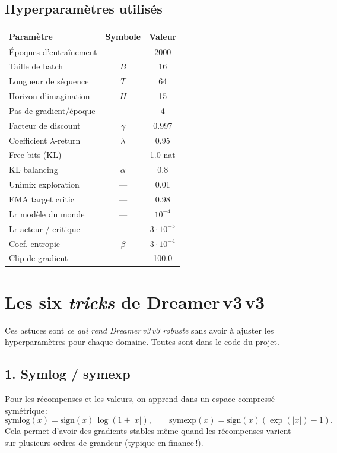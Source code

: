 \documentclass[11pt,a4paper]{article}
\newcommand{\dreamer}{Dreamer\,v3}
\begin{document}
\subsection{Hyperparamètres utilisés}
\begin{center}
\begin{tabular}{lcc}
\toprule
\textbf{Paramètre} & \textbf{Symbole} & \textbf{Valeur} \\
\midrule
Époques d'entraînement & --- & 2000 \\
Taille de batch & \(B\) & 16 \\
Longueur de séquence & \(T\) & 64 \\
Horizon d'imagination & \(H\) & 15 \\
Pas de gradient/époque & --- & 4 \\
Facteur de discount & \(\gamma\) & 0.997 \\
Coefficient \(\lambda\)-return & \(\lambda\) & 0.95 \\
Free bits (KL) & --- & 1.0 nat \\
KL balancing & \(\alpha\) & 0.8 \\
Unimix exploration & --- & 0.01 \\
EMA target critic & --- & 0.98 \\
Lr modèle du monde & --- & \(10^{-4}\) \\
Lr acteur / critique & --- & \(3\cdot 10^{-5}\) \\
Coef. entropie & \(\beta\) & \(3\cdot 10^{-4}\) \\
Clip de gradient & --- & 100.0 \\
\bottomrule
\end{tabular}
\end{center}

\section{Les six \emph{tricks} de \dreamer{}\,v3}

Ces astuces sont \emph{ce qui rend \dreamer{}\,v3 robuste} sans avoir à
ajuster les hyperparamètres pour chaque domaine. Toutes sont dans le code
du projet.

\subsection{1. Symlog / symexp}
Pour les récompenses et les valeurs, on apprend dans un espace compressé
symétrique\,:
\begin{equation}
\mathrm{symlog}(x) = \mathrm{sign}(x)\,\log(1+|x|),\qquad
\mathrm{symexp}(x) = \mathrm{sign}(x)(\exp(|x|)-1).
\end{equation}
Cela permet d'avoir des gradients stables même quand les récompenses
varient sur plusieurs ordres de grandeur (typique en finance\,!).
\end{document}
